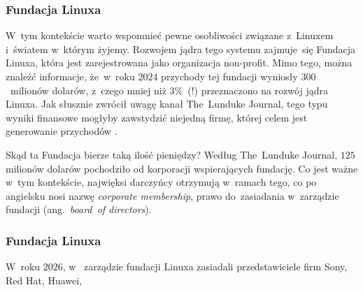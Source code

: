 \documentclass[10pt,t]{beamer}
\begin{document}
\begin{frame}
  \frametitle{Fundacja Linuxa}


  W~tym kontekście warto wspomnieć pewne osobliwości związane z~Linuxem
  i~światem w~którym żyjemy. Rozwojem jądra tego systemu zajmuje~się
  {Fundacja Linuxa}, która jest zarejestrowana jako organizacja non-profit.
  Mimo tego, można znaleźć informacje, że~w~roku $2024$ przychody tej
  fundacji wyniosły $300$~milionów dolarów, z~czego mniej niż $3\%$~(!)
  przeznaczono na rozwój jądra Linuxa. Jak słusznie zwrócił uwagę kanał
  The~Lunduke Journal, tego typu wyniki finansowe mogłyby zawstydzić
  niejedną firmę, której celem jest generowanie przychodów
  \parencite{TLJ-Linux-Foundation-Drops-Linux-Spending-to-Historic-ETC-Ver-2024}.

  Skąd ta Fundacja bierze taką ilość pieniędzy? Według The~Lunduke Journal,
  $125$ milionów dolarów pochodziło od korporacji wspierających fundację.
  Co jest ważne w~tym kontekście, najwięksi darczyńcy otrzymują w~ramach
  tego, co po angielsku nosi nazwę \textit{corporate membership}, prawo
  do~zasiadania w~zarządzie fundacji (ang.~\textit{board~of directors}).

\end{frame}





\begin{frame}
  \frametitle{Fundacja Linuxa}


  W~roku $2026$,
  w~
  {zarządzie fundacji Linuxa} zasiadali przedstawiciele firm Sony, Red
  Hat, Huawei,

\end{frame}
\end{document}
